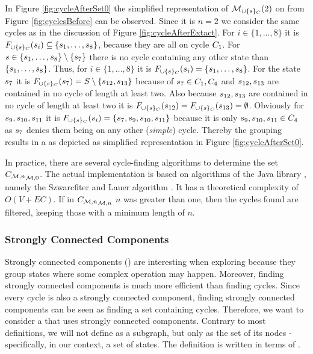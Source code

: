 \documentclass[preview]{standalone}
\begin{document}
\begin{exmp}
	In Figure \ref{fig:cycleAfterSet0} the simplified representation of $\viewcycleset(2)$ on \chgph from Figure \ref{fig:cyclesBefore} can be observed. Since it is $n=2$ we consider the same cycles as in the discussion of Figure \ref{fig:cycleAfterExtact}. 
For $i \in \{1, \dots, 8\}$ it is $\gfctcycleset(\state_i) \subseteq \{\state_1, \dots, \state_8\}$, because they are all on cycle ${C}_1$. For ${s} \in \{{s}_1, \dots, {s}_8\} \setminus \{{s}_7\}$ there is no cycle containing any other state than $\{{s}_1, \dots, {s}_8\}$. Thus, for $i \in \{1, \dots, 8\}$ it is $\gfctcycleset(\state_i) = \{\state_1, \dots, \state_8\}$. For the state ${s}_7$ it is $\gfctcycleset(\state_7) = \states \setminus \{\state_{12}, \state_{13}\}$ because of ${s}_7 \in {C}_1,{C}_4$ and ${s}_{12}, {s}_{13}$ are contained in no cycle of length at least two. Also because ${s}_{12}, {s}_{13}$ are contained in no cycle of length at least two it is $\gfctcycleset(\state_{12}) = \gfctcycleset(\state_{13}) = \emptyset$. Obviously for ${s}_9, {s}_{10}, {s}_{11}$ it is $\gfctcycleset(\state_i) = \{\state_7, \state_9, \state_{10}, \state_{11}\}$ because it is only ${s}_9, {s}_{10}, {s}_{11} \in {C}_4$ as ${s}_7$ denies them being on any other (\emph{simple}) cycle. Thereby the grouping results in a \viewN as depicted as simplified representation in Figure \ref{fig:cycleAfterSet0}.
\end{exmp}

In practice, there are several cycle-finding algorithms to determine the set ${{C}_{{{\mathcal{M}}}, n}}_{{{{\mathcal{M}}}},0}$. The actual implementation is based on algorithms of the Java library \jgrapht \cite{Michail2020}, namely the Szwarcfiter and Lauer algorithm \cite{Szwarcfiter1976}. It has a theoretical complexity of $O(V+EC)$. If in ${{C}_{{{\mathcal{M}}}, n}}_{{{{\mathcal{M}}}},n}$ $n$ was greater than one, then the cycles found are filtered, keeping those with a minimum length of $n$.

\subsubsection{Strongly Connected Components}
Strongly connected components (\sccsN) are interesting when exploring \achgphN because they group states where some complex operation may happen. Moreover, finding strongly connected components is much more efficient than finding cycles. Since every cycle is also a strongly connected component, finding strongly connected components can be seen as finding a set containing cycles. Therefore, we want to consider a \viewN that uses strongly connected components. Contrary to most definitions, we will not define \sccN as a subgraph, but only as the set of its nodes - specifically, in our context, a set of states. The definition is written in terms of \achgphN.
\end{document}
